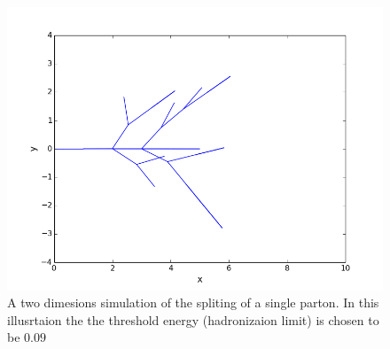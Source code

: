 %
%
\begin{figure}[hbtp]
\centering
\includegraphics[scale=.6]{images/2D_partonshower.png}
\caption{A two dimesions simulation of the spliting of a single parton. In this illusrtaion the the threshold energy (hadronizaion limit) is chosen to be $0.09$}\label{fig:2d}
\end{figure}

